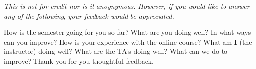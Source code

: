 \documentclass[addpoints, 12pt] {exam}
\begin{document}
\begin{questions}
\newpage
\question \emph{This is not for credit nor is it anoynymous. However, if you would like to answer any of the following, your feedback would be appreciated.}

How is the semester going for you so far? What are you doing well? In what ways can you improve?\vspace{3in}\newline
How is your experience with the online course? What am {\bf I} (the instructor) doing well? What are the TA's doing well? What can we do to improve? \vspace{3in}\newline Thank you for you thoughtful feedback.
\end{questions}
\end{document}
